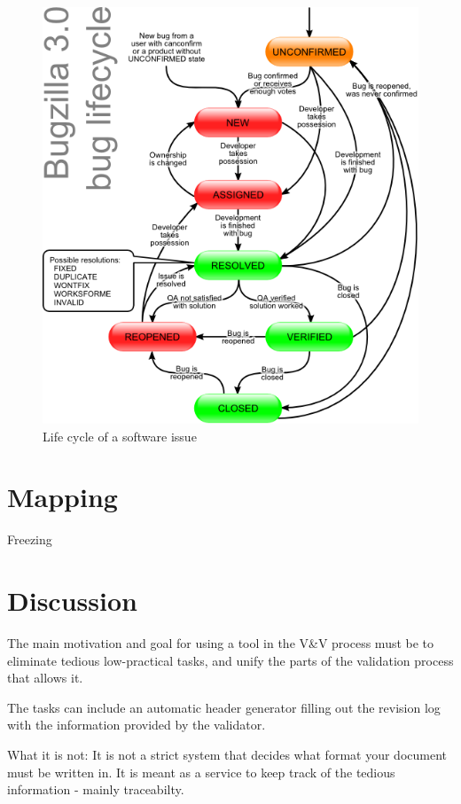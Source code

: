 \documentclass[10pt,a4paper]{article}
\begin{document}
\begin{figure}[h]
\centering
\includegraphics[scale=0.45]{fig/Bugzilla_Lifecycle_color-aqua.png} 
\caption{Life cycle of a software issue}
\label{fig:software_issue_life_cycle}
\end{figure}


\section{Mapping}
Freezing 

\section{Discussion}
The main motivation and goal for using a tool in the V\&V process must be to eliminate tedious low-practical tasks, and unify the parts of the validation process that allows it.

The tasks can include an automatic header generator filling out the revision log with the information provided by the validator.

What it is not:
It is not a strict system that decides what format your document must be written in. It is meant as a service to keep track of the tedious information - mainly traceabilty.
\end{document}

